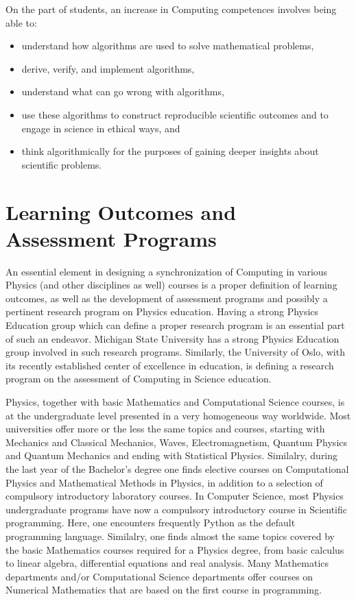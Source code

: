 \documentclass[graybox,envcountchap,sectrefs]{svmult}
\begin{document}
On the part of students, an increase in Computing competences involves being able to:
\begin{itemize}
\item understand how algorithms are used to solve mathematical problems,

\item derive, verify, and implement algorithms,

\item understand what can go wrong with algorithms,

\item use these algorithms to construct reproducible scientific outcomes and to engage in science in ethical ways, and

\item think algorithmically for the purposes of gaining deeper insights about scientific problems.
\end{itemize}

\noindent
\section{Learning Outcomes and Assessment Programs}

An essential element in designing a synchronization of Computing in
various Physics (and other disciplines as well) courses is a proper
definition of learning outcomes, as well as the development of
assessment programs and possibly a pertinent research program on Physics education. 
Having a strong Physics Education
group which can define a proper research program is an essential part
of such an endeavor. Michigan State University has a strong Physics
Education group involved in such research programs. Similarly, the
University of Oslo, with its recently established center of excellence
in education, is defining a research program on the assessment of
Computing in Science education.

Physics, together with basic Mathematics and Computational Science
courses, is at the undergraduate level presented in a very homogeneous
way worldwide.  Most universities offer more or the less the same
topics and courses, starting with Mechanics and Classical Mechanics,
Waves, Electromagnetism, Quantum Physics and Quantum Mechanics and
ending with Statistical Physics. Similalry, during the last year of
the Bachelor's degree one finds elective courses on Computational Physics
and Mathematical Methods in Physics, in addition to a selection of compulsory
introductory laboratory courses. In Computer Science, most Physics
undergraduate programs have now a compulsory introductory course in
Scientific programming. Here, one encounters frequently Python as the
default programming language.  Similalry, one finds almost the same
topics covered by the basic Mathematics courses required for a Physics
degree, from basic calculus to linear algebra, differential equations
and real analysis. Many Mathematics departments and/or Computational Science departments 
offer courses on
Numerical Mathematics that are based on the first course in
programming.
\end{document}
